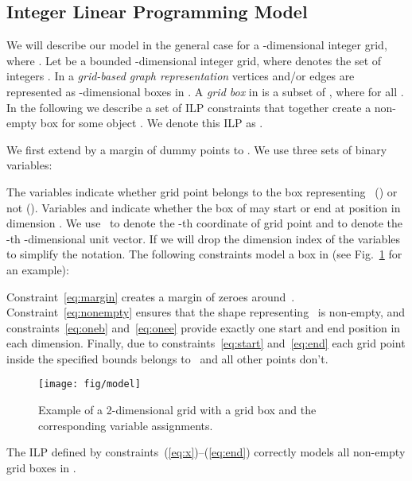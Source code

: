 \documentclass[runningheads]{llncs}
\newcounter{constr}
\begin{document}
\subsection{Integer Linear Programming Model}\label{sec:ilpmodel}
We will describe our model in the general case for a -dimensional
integer grid, where . Let  be a bounded -dimensional integer grid,
where  denotes the set of integers .
In a \emph{grid-based graph representation} vertices and/or edges are
represented as -dimensional boxes in . A \emph{grid
box}  in  is a subset  of , where  for
all . In the following we describe a set of ILP
constraints that together create a non-empty box for some object  .
 We denote this ILP as .

We first extend  by a margin of dummy points to .
We use three sets of binary variables:

The variables  indicate whether grid point  belongs to the box representing~ () or not (). Variables  and  indicate whether the box of  may start or end at position  in dimension . We use~ to denote the -th coordinate of grid point  and  to denote the -th -dimensional unit vector. If  we will drop the dimension index of the variables to simplify the notation.
The following constraints model a box in  (see Fig.~\ref{fig:example2d} for an example): 


Constraint~\eqref{eq:margin} creates a margin of zeroes
around~.
Constraint~\eqref{eq:nonempty} ensures that the shape representing~
is non-empty, and constraints~\eqref{eq:oneb} and~\eqref{eq:onee}
provide exactly one start and end position in each dimension.
Finally, due to constraints~\eqref{eq:start} and~\eqref{eq:end} each
grid point inside the specified bounds belongs to~ and all other
points don't.

\begin{figure}[tb]
	\centering
		\texttt{[image: fig/model]}
	\caption{\small Example of a 2-dimensional  grid
 with a 
	 grid box and the corresponding variable assignments.}
	\label{fig:example2d}
	\vspace{-2ex}
\end{figure}


\newcommand{\lemboxtext}{The ILP  defined by constraints~(\ref{eq:x})--(\ref{eq:end}) correctly models all non-empty grid boxes in .
}

\begin{lemma}\label{lem:correctbox}
\lemboxtext
\end{lemma}
\end{document}
